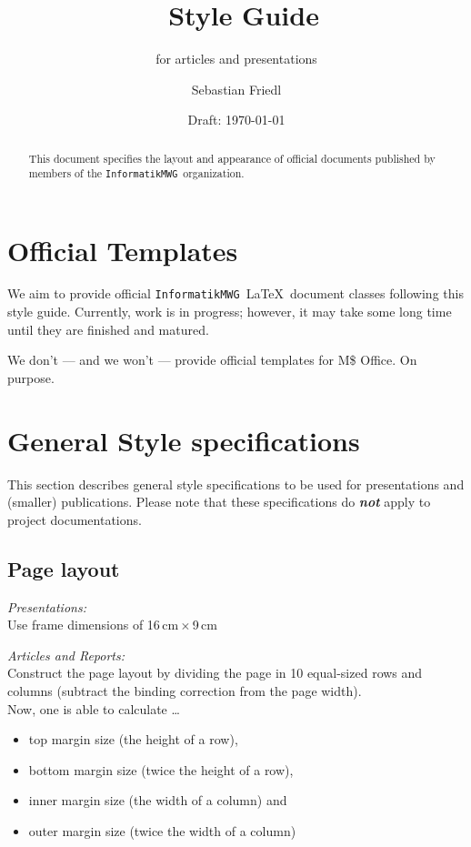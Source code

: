 \documentclass[abstracton]{scrartcl}
\title{\informatikMWG\ Style Guide}
\subtitle{for articles and presentations}
\author{Sebastian Friedl}
\date{Draft: \today}
\def\informatikMWG{\texttt{InformatikMWG}}
\begin{document}
    \maketitle

    \begin{abstract}
        This document specifies the layout and appearance of official documents published by members of the \informatikMWG\ organization.
    \end{abstract}
    
    \bigskip\bigskip\bigskip
    
    \section{Official Templates}
    We aim to provide official \informatikMWG\ \LaTeX\ document classes following this style guide. Currently, work is in progress; however, it may take some long time until they are finished and matured.

    \medskip
    We don't --- and we won't --- provide official templates for M\$ Office. On purpose.
    
    
    \section{General Style specifications}
    This section describes general style specifications to be used for presentations and (smaller) publications.
    Please note that these specifications do \emph{\textbf{not}} apply to project documentations.
    
    \subsection{Page layout}
    \textit{Presentations:} \\
    Use frame dimensions of 16\,cm\,$\times$\,9\,cm
    
    \medskip
    \textit{Articles and Reports:} \\
    Construct the page layout by dividing the page in 10 equal-sized rows and columns (subtract the binding correction from the page width). \\[\smallskipamount]
    Now, one is able to calculate \dots
    \begin{itemize}\itemsep0pt
        \item top margin size (the height of a row),
        \item bottom margin size (twice the height of a row),
        \item inner margin size (the width of a column) and
        \item outer margin size (twice the width of a column)
    \end{itemize}
\end{document}
